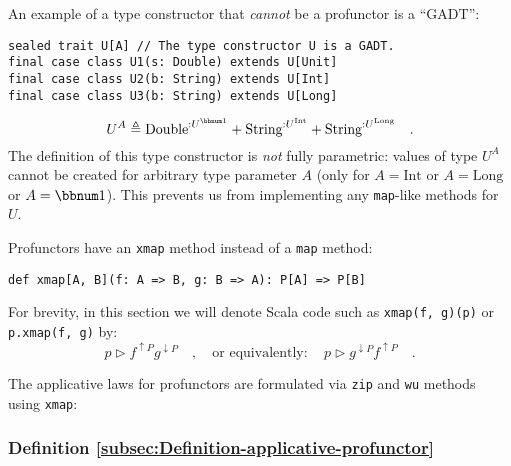 An example of a type constructor that \emph{cannot} be a profunctor
is a \textsf{``}GADT\textsf{''}:

\begin{lstlisting}
sealed trait U[A] // The type constructor U is a GADT.
final case class U1(s: Double) extends U[Unit]
final case class U2(b: String) extends U[Int]
final case class U3(b: String) extends U[Long]
\end{lstlisting}
\[
U^{A}\triangleq\text{Double}^{:U^{\bbnum 1}}+\text{String}^{:U^{\text{Int}}}+\text{String}^{:U^{\text{Long}}}\quad.
\]
The definition of this type constructor is \emph{not} fully parametric:
values of type $U^{A}$ cannot be created for arbitrary type parameter
$A$ (only for $A=\text{Int}$ or $A=\text{Long}$ or $A=\bbnum 1$).
This prevents us from implementing any \lstinline!map!-like methods
for $U$.

Profunctors have an \lstinline!xmap! method instead of a \lstinline!map!
method:
\begin{lstlisting}
def xmap[A, B](f: A => B, g: B => A): P[A] => P[B]
\end{lstlisting}
 For brevity, in this section we will denote Scala code such as \lstinline!xmap(f, g)(p)!
or \lstinline!p.xmap(f, g)! by:
\[
p\triangleright f^{\uparrow P}g^{\downarrow P}\quad,\quad\text{or equivalently}:\quad p\triangleright g^{\downarrow P}f^{\uparrow P}\quad.
\]

The applicative laws for profunctors are formulated via \lstinline!zip!
and \lstinline!wu! methods using \lstinline!xmap!:

\subsubsection{Definition \label{subsec:Definition-applicative-profunctor}\ref{subsec:Definition-applicative-profunctor}}

